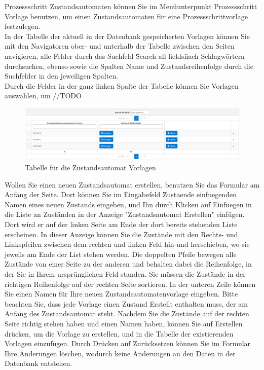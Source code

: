\documentclass[enabledeprecatedfontcommands,fontsize=12pt,paper=a4,twoside]{scrartcl}
\begin{document}
Prozessschritt Zustandsautomaten können Sie im Menüunterpunkt Prozessschritt Vorlage benutzen, um einen Zustandsautomaten für eine Prozessschrittvorlage festzulegen. \\

In der Tabelle der aktuell in der Datenbank gespeicherten Vorlagen können Sie mit den Navigatoren ober- und unterhalb der Tabelle zwischen den Seiten navigieren, alle Felder durch das Suchfeld \"Search all fields\" nach Schlagwörtern durchsuchen, ebenso sowie die Spalten Name und Zustandsreihenfolge durch die Suchfelder in den jeweiligen Spalten. \\
Durch die Felder in der ganz linken Spalte der Tabelle können Sie Vorlagen auswählen, um //TODO \\

\begin{figure}[h!]
\begin{center}
 \includegraphics[width=\textwidth]{screenshots/pk/prozessschrittzustandsautomatvorlageubersicht.png}
  \caption{Tabelle für die Zustandsautomat Vorlagen}
  \label{fig:boat2}
\end{center}
\end{figure}

Wollen Sie einen neuen Zustandsautomat erstellen, benutzen Sie das Formular am Anfang der Seite. Dort können Sie im Eingabefeld \"Zustaende einfuegen\" den Namen eines neuen Zustands eingeben, und Ihn durch Klicken auf Einfuegen in die Liste an Zuständen in der Anzeige "Zustandsautomat Erstellen" einfügen. Dort wird er auf der linken Seite am Ende der dort bereits stehenden Liste erscheinen. In dieser Anzeige können Sie die Zustände mit den Rechts- und Linkspfeilen zwischen dem rechten und linken Feld hin-und herschieben, wo sie jeweils am Ende der List stehen werden. Die doppelten Pfeile bewegen alle Zustände von einer Seite zu der anderen und behalten dabei die Reihenfolge, in der Sie in Ihrem ursprünglichen Feld standen. Sie müssen die Zustände in der richtigen Reihenfolge auf der rechten Seite sortieren. In der unteren Zeile können Sie einen Namen für Ihre neuen Zustandsautomatenvorlage eingeben. Bitte beachten Sie, dass jede Vorlage einen Zustand Erstellt enthalten muss, der am Anfang des Zustandsautomat steht. 
Nachdem Sie die Zustände auf der rechten Seite richtig stehen haben und einen Namen haben, können Sie auf Erstellen drücken, um die Vorlage zu erstellen, und in die Tabelle der existierenden Vorlagen einzufügen. Durch Drücken auf Zurücksetzen können Sie im Formular Ihre Änderungen löschen, wodurch keine Änderungen an den Daten in der Datenbank entstehen. \\
\end{document}
